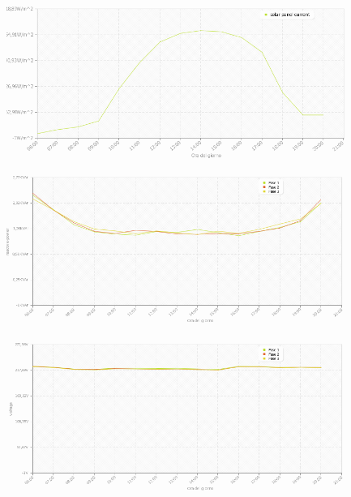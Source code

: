 \begin{figure}[!h]
\centering
\includegraphics[width=400pt]{img/portale/radiazione-giornaliera.png}
\end{figure}
\begin{figure}[!h]
\centering
\includegraphics[width=400pt]{img/portale/reactive-power-power-transponder.png}
\end{figure}
\begin{figure}[!h]
\centering
\includegraphics[width=400pt]{img/portale/voltage-power-transponder.png}
\end{figure}













